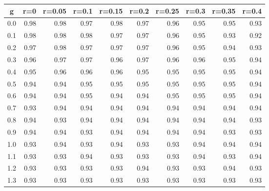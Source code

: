 %
\begin{table}[!tbp]
 \begin{center}
 \begin{tabular}{rrrrrrrrrr}\hline\hline
\multicolumn{1}{c}{g}&\multicolumn{1}{c}{r=0}&\multicolumn{1}{c}{r=0.05}&\multicolumn{1}{c}{r=0.1}&\multicolumn{1}{c}{r=0.15}&\multicolumn{1}{c}{r=0.2}&\multicolumn{1}{c}{r=0.25}&\multicolumn{1}{c}{r=0.3}&\multicolumn{1}{c}{r=0.35}&\multicolumn{1}{c}{r=0.4}\tabularnewline
\hline
0.0&0.98&0.98&0.97&0.98&0.97&0.96&0.95&0.95&0.93\tabularnewline
0.1&0.98&0.98&0.98&0.97&0.97&0.96&0.95&0.93&0.92\tabularnewline
0.2&0.97&0.98&0.97&0.97&0.97&0.96&0.95&0.94&0.93\tabularnewline
0.3&0.96&0.97&0.97&0.96&0.97&0.96&0.96&0.95&0.94\tabularnewline
0.4&0.95&0.96&0.96&0.96&0.95&0.95&0.95&0.95&0.94\tabularnewline
0.5&0.94&0.94&0.95&0.95&0.95&0.95&0.95&0.95&0.94\tabularnewline
0.6&0.94&0.94&0.95&0.94&0.94&0.95&0.95&0.95&0.94\tabularnewline
0.7&0.93&0.94&0.94&0.94&0.94&0.94&0.94&0.94&0.94\tabularnewline
0.8&0.94&0.93&0.94&0.94&0.94&0.94&0.94&0.94&0.93\tabularnewline
0.9&0.94&0.94&0.93&0.94&0.94&0.94&0.94&0.93&0.93\tabularnewline
1.0&0.93&0.94&0.93&0.94&0.93&0.93&0.94&0.94&0.94\tabularnewline
1.1&0.93&0.93&0.94&0.93&0.93&0.93&0.94&0.93&0.94\tabularnewline
1.2&0.93&0.93&0.93&0.93&0.94&0.93&0.93&0.94&0.93\tabularnewline
1.3&0.93&0.93&0.93&0.93&0.93&0.93&0.93&0.93&0.93\tabularnewline
\hline
\end{tabular}

\end{center}

\end{table}


